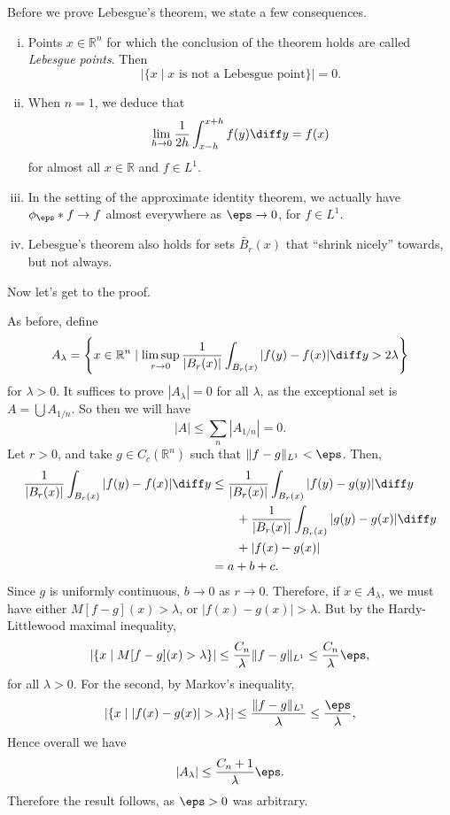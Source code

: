 \documentclass[12pt]{article}
\begin{document}
Before we prove Lebesgue's theorem, we state a few consequences.
\begin{enumerate}[(i)]
	\item Points $x \in \mathbb{R}^n$ for which the conclusion of the theorem holds are called \emph{Lebesgue points}. Then
		\[
			|\{x \mid x \text{ is not a Lebesgue point}\}| = 0.
		\]
	\item When $n = 1$, we deduce that
		\[
		\lim_{h \to 0} \frac{1}{2h} \int_{x - h}^{x + h} f(y) \diff y = f(x)
		\]
		for almost all $x \in \mathbb{R}$ and $f \in L^1$.
	\item In the setting of the approximate identity theorem, we actually have $\phi_\eps \ast f \to f$ almost everywhere as $\eps \to 0$, for $f \in L^1$.
	\item Lebesgue's theorem also holds for sets $\tilde{B_r}(x)$ that ``shrink nicely'' towards, but not always.
\end{enumerate}


Now let's get to the proof.

\begin{proofbox}
	As before, define
	\[
		A_\lambda = \left\{x \in \mathbb{R}^n \mid \limsup_{r \to 0} \frac{1}{|B_r(x)|} \int_{B_r(x)} |f(y) - f(x)| \diff y > 2 \lambda\right\}
	\]
	for $\lambda > 0$. It suffices to prove $|A_\lambda| = 0$ for all $\lambda$, as the exceptional set is $A = \bigcup A_{1/n}$. So then we will have
	\[
	|A| \leq \sum_n |A_{1/n}| = 0.
	\]
	Let $r > 0$, and take $g \in C_c(\mathbb{R}^n)$ such that $\|f - g\|_{L^1} < \eps$. Then,
	\begin{align*}
		\frac{1}{|B_r(x)|} \int_{B_r(x)} |f(y) - f(x)| \diff y &\leq \frac{1}{|B_r(x)|} \int_{B_r(x)} |f(y) - g(y)| \diff y \\
								       &\qquad + \frac{1}{|B_r(x)|} \int_{B_r(x)} |g(y) - g(x)| \diff y \\
								       &\qquad + |f(x) - g(x)| \\
								       &= a + b + c.
	\end{align*}
	Since $g$ is uniformly continuous, $b \to 0$ as $r \to 0$. Therefore, if $x \in A_\lambda$, we must have either $M[f - g](x) > \lambda$, or $|f(x) - g(x)| > \lambda$. But by the Hardy-Littlewood maximal inequality,
	\[
		|\{x \mid M[f - g](x) > \lambda\}| \leq \frac{C_n}{\lambda} \|f - g\|_{L^1} \leq \frac{C_n}{\lambda} \eps,
	\]
	for all $\lambda > 0$. For the second, by Markov's inequality,
	\[
		|\{x \mid |f(x) - g(x)| > \lambda\}| \leq \frac{\|f - g\|_{L^1}}{\lambda} \leq \frac{\eps}{\lambda},
	\]
	Hence overall we have
	\[
	|A_\lambda| \leq \frac{C_n + 1}{\lambda} \eps.
	\]
	Therefore the result follows, as $\eps > 0$ was arbitrary.
\end{proofbox}
\end{document}
